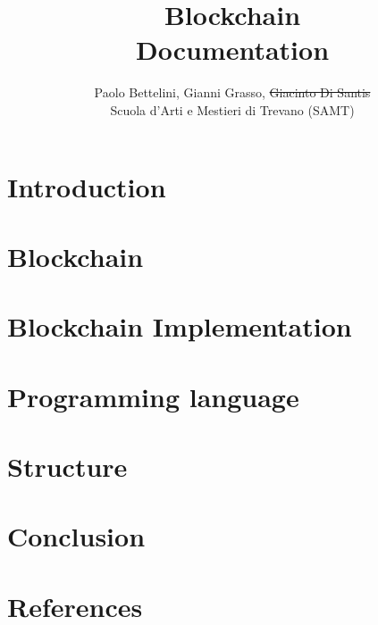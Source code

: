 \documentclass{article}
\title{
    Blockchain \\
    \large Documentation}
\author{
    Paolo Bettelini, Gianni Grasso, \sout{Giacinto Di Santis} \\
    \large Scuola d'Arti e Mestieri di Trevano (SAMT)}
\date{}
\begin{document}
\maketitle

\pagebreak

\tableofcontents

\pagebreak

\section{Introduction}



\pagebreak

\section{Blockchain}



\pagebreak

\section{Blockchain Implementation}



\pagebreak

\section{Programming language}



\pagebreak

\section{Structure}



\pagebreak

\section{Conclusion}



\pagebreak

\section{References}

\nocite{*} %

\printbibliography[type=online, heading=subbibliography, title=Sitography]
\end{document}
